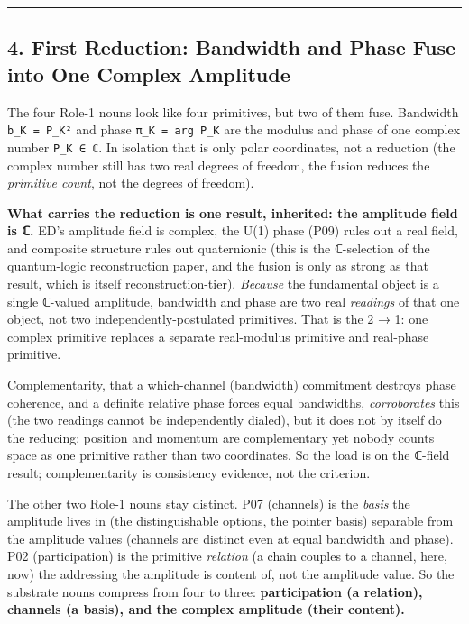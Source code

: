 \documentclass[
  11pt,
]{article}
\begin{document}
\begin{center}\rule{0.5\linewidth}{0.5pt}\end{center}

\subsection{4. First Reduction: Bandwidth and Phase Fuse into One
Complex
Amplitude}\label{first-reduction-bandwidth-and-phase-fuse-into-one-complex-amplitude}

The four Role-1 nouns look like four primitives, but two of them fuse.
Bandwidth \texttt{b\_K\ =\ \textbar{}P\_K\textbar{}²} and phase
\texttt{π\_K\ =\ arg\ P\_K} are the modulus and phase of one complex
number \texttt{P\_K\ ∈\ ℂ}. In isolation that is only polar coordinates,
not a reduction (the complex number still has two real degrees of
freedom, the fusion reduces the \emph{primitive count}, not the degrees
of freedom).

\textbf{What carries the reduction is one result, inherited: the
amplitude field is ℂ.} ED's amplitude field is complex, the U(1) phase
(P09) rules out a real field, and composite structure rules out
quaternionic (this is the ℂ-selection of the quantum-logic
reconstruction paper, and the fusion is only as strong as that result,
which is itself reconstruction-tier). \emph{Because} the fundamental
object is a single ℂ-valued amplitude, bandwidth and phase are two real
\emph{readings} of that one object, not two independently-postulated
primitives. That is the 2 → 1: one complex primitive replaces a separate
real-modulus primitive and real-phase primitive.

Complementarity, that a which-channel (bandwidth) commitment destroys
phase coherence, and a definite relative phase forces equal bandwidths,
\emph{corroborates} this (the two readings cannot be independently
dialed), but it does not by itself do the reducing: position and
momentum are complementary yet nobody counts space as one primitive
rather than two coordinates. So the load is on the ℂ-field result;
complementarity is consistency evidence, not the criterion.

The other two Role-1 nouns stay distinct. P07 (channels) is the
\emph{basis} the amplitude lives in (the distinguishable options, the
pointer basis) separable from the amplitude values (channels are
distinct even at equal bandwidth and phase). P02 (participation) is the
primitive \emph{relation} (a chain couples to a channel, here, now) the
addressing the amplitude is content of, not the amplitude value. So the
substrate nouns compress from four to three: \textbf{participation (a
relation), channels (a basis), and the complex amplitude (their
content).}
\end{document}
